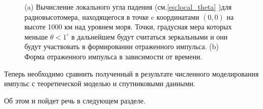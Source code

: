 \begin{figure}[h]
\begin{subfigure}{.45\linewidth}
         \caption{}
     \end{subfigure}
     \caption{(a) Вычисление локального угла падения (см.\eqref{eq:local_theta}
         )для радиовысотомера, находящегося в точке c координатами $(0,0)$ на
         высоте 1000 км над уровнем моря.  Точки, градусная мера которых меньше
         $\theta<1^\circ$ в дальнейшем будут считаться зеркальными и они будут
         участвовать в формировании отраженного импульса.  (b) Форма
     отраженного импульса в зависимости от времени.}
    \label{fig:model_impuls}
 \end{figure}

 Теперь необходимо сравнить полученный в результате численного моделирования
 импульс с теоретической моделью и спутниковыми данными.

 Об этом и пойдет речь в следующем разделе.
